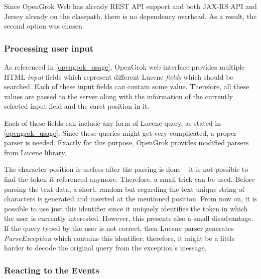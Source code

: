 Since OpenGrok Web has already REST API support and both JAX-RS API and Jersey already on the classpath,
there is no dependency overhead. As a result, the second option was chosen.

\subsubsection{Processing user input}
\label{processing_user_input}
As referenced in \ref{opengrok_usage}, OpenGrok web interface provides multiple HTML \textit{input} fields which
represent different Lucene \textit{fields} which should be searched. Each of these input fields can contain some value.
Therefore, all these values are passed to the server along with the information of the currently selected input field and
the caret position in it.

Each of these fields can include any form of Lucene query, as stated in \ref{opengrok_usage}. Since these queries might
get very complicated, a proper parser is needed. Exactly for this purpose, OpenGrok provides modified parsers from Lucene library.


The character position is
useless after the parsing is done – it is not possible to find the token it referenced anymore. Therefore, a small
trick can be used. Before parsing the text data, a short, random but regarding the text unique string of characters
is generated and inserted at the mentioned position. From now on, it is possible to use just this identifier since it
uniquely identifies the token in which the user is currently interested. However, this presents also a small disadvantage.
If the query typed by the user is not correct, then Lucene parser generates \textit{ParseException} which contains
this identifier; therefore, it might be a little harder to decode the original query from the exception's message.

\subsubsection{Reacting to the Events}


